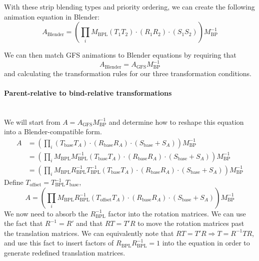 \documentclass{article}
\begin{document}
With these strip blending types and priority ordering, we can create the following animation equation in Blender:
\begin{equation}
A_\mathrm{Blender} = \left( \prod_i {M}_\mathrm{BPL} \left(T_1 T_2\right) \cdot \left(R_1 R_2\right) \cdot \left(S_1 S_2\right) \right) M_\mathrm{BP}^{-1}
\end{equation}

We can then match GFS animations to Blender equations by requiring that
\begin{equation}
A_\mathrm{Blender} = A_\mathrm{GFS} M^{-1}_\mathrm{BP}
\end{equation}
and calculating the transformation rules for our three transformation conditions.

\paragraph{Parent-relative to bind-relative transformations}\mbox{}\\
We will start from $A = A_\mathrm{GFS} M^{-1}_\mathrm{BP}$ and determine how to reshape this equation into a Blender-compatible form.
\begin{align}
A &= \left( \prod_i \left(T_\mathrm{base} T_A\right) \cdot \left(R_\mathrm{base} R_A\right) \cdot \left(S_\mathrm{base} + S_A\right) \right) M_\mathrm{BP}^{-1}\\
 &= \left( \prod_i M_\mathrm{BPL} M_\mathrm{BPL}^{-1} \left(T_\mathrm{base} T_A\right) \cdot \left(R_\mathrm{base} R_A\right) \cdot \left(S_\mathrm{base} + S_A\right) \right) M_\mathrm{BP}^{-1}\\
  &= \left( \prod_i M_\mathrm{BPL} R_\mathrm{BPL}^{-1} T_\mathrm{BPL}^{-1} \left(T_\mathrm{base} T_A\right) \cdot \left(R_\mathrm{base} R_A\right) \cdot \left(S_\mathrm{base} + S_A\right) \right) M_\mathrm{BP}^{-1}
\end{align}
Define $T_\mathrm{offset} = T^{-1}_\mathrm{BPL} T_\mathrm{base}$,
\begin{equation}
A  = \left( \prod_i M_\mathrm{BPL} R_\mathrm{BPL}^{-1} \left(T_\mathrm{offset} T_A\right) \cdot \left(R_\mathrm{base} R_A\right) \cdot \left(S_\mathrm{base} + S_A\right) \right) M_\mathrm{BP}^{-1}
\end{equation}
We now need to absorb the $R^{-1}_\mathrm{BPL}$ factor into the rotation matrices. We can use the fact that $R^{-1} = R'$ and that $RT = T'R$ to move the rotation matrices past the translation matrices. We can equivalently note that $RT = T'R \Rightarrow T = R^{-1}TR$, and use this fact to insert factors of $R_\mathrm{BPL}R^{-1}_\mathrm{BPL} = 1$ into the equation in order to generate redefined translation matrices. 
\end{document}
